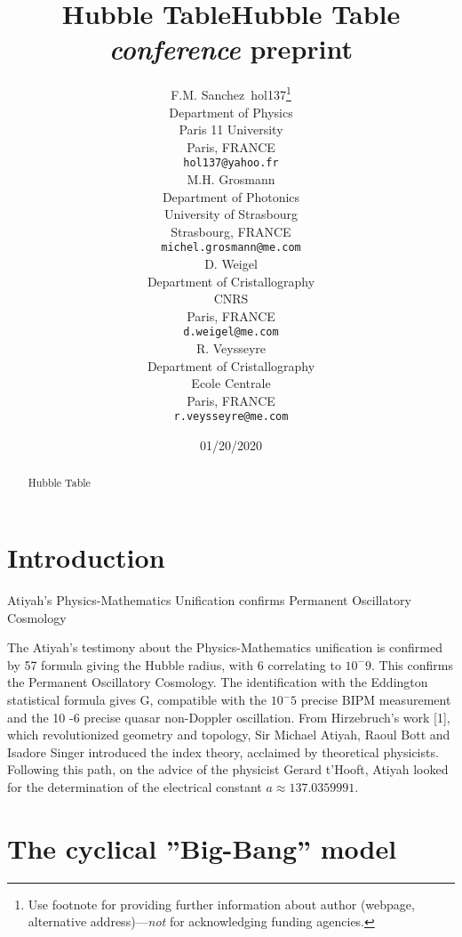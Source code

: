 \documentclass[a4paper,9pt]{article}
\title{Hubble Table}
\date{01/20/2020}
\title{Hubble Table \emph{conference} preprint}
\author{
  F.M. Sanchez~hol137\thanks{Use footnote for providing further
    information about author (webpage, alternative
    address)---\emph{not} for acknowledging funding agencies.} \\
  Department of Physics\\
  Paris 11 University\\
  Paris, FRANCE \\
  \texttt{hol137@yahoo.fr} \\
   \And
 M.H. Grosmann \\
  Department of Photonics\\
  University of Strasbourg\\
  Strasbourg, FRANCE \\
  \texttt{michel.grosmann@me.com} \\
   \And
 D. Weigel \\
  Department of Cristallography\\
  CNRS\\
  Paris, FRANCE \\
  \texttt{d.weigel@me.com} \\
   \And
 R. Veysseyre \\
  Department of Cristallography\\
  Ecole Centrale\\
  Paris, FRANCE \\
  \texttt{r.veysseyre@me.com} \\
}
\begin{document}
\maketitle

\begin{abstract}
Hubble Table
\end{abstract}




\section{Introduction}
Atiyah's Physics-Mathematics Unification confirms Permanent Oscillatory Cosmology

The Atiyah's testimony about the Physics-Mathematics unification is confirmed by 57 formula
giving the Hubble radius, with 6 correlating to $10^-9$. This confirms the Permanent Oscillatory
Cosmology. The identification with the Eddington statistical formula gives G, compatible with the
$10^-5$ precise BIPM measurement and the 10 -6 precise quasar non-Doppler oscillation.
From Hirzebruch's work [1], which revolutionized geometry and topology, Sir Michael Atiyah,
Raoul Bott and Isadore Singer introduced the index theory, acclaimed by theoretical physicists.
Following this path, on the advice of the physicist Gerard t'Hooft, Atiyah looked for the
determination of the electrical constant $a \approx 137.0359991$. 


\section{The cyclical ”Big-Bang” model}
\label{sec:headings}
\end{document}
